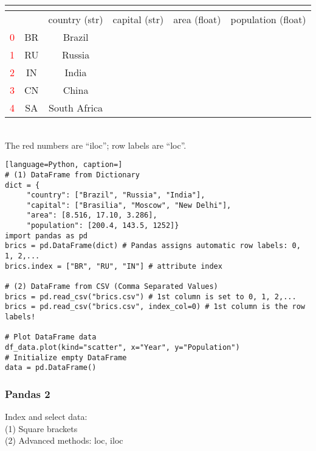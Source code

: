 \documentclass[12pt]{article}
\newcommand{\q}[1]{``#1''}
\begin{document}
\begin{table}[!ht]
\centering
\begin{tabular}{c | c | c | c | c | c }
\multicolumn{5}{l}{} \\ [-10pt]
\hline\hline
& & country (str) & capital (str) & area (float) & population (float)  \\
\hline
\textcolor{red}{0} & BR & Brazil & & &  \\
\textcolor{red}{1} & RU & Russia & & &  \\
\textcolor{red}{2} & IN & India & & &  \\
\textcolor{red}{3} & CN & China & & &  \\
\textcolor{red}{4} & SA & South Africa & & &  \\
\hline
\end{tabular}

\noindent
\textcolor{white}{.} \\
The red numbers are \q{iloc}; row labels are \q{loc}.
\end{table}

\begin{lstlisting}[language=Python, caption=]
# (1) DataFrame from Dictionary
dict = {
     "country": ["Brazil", "Russia", "India"], 
     "capital": ["Brasilia", "Moscow", "New Delhi"], 
     "area": [8.516, 17.10, 3.286], 
     "population": [200.4, 143.5, 1252]}
import pandas as pd
brics = pd.DataFrame(dict) # Pandas assigns automatic row labels: 0, 1, 2,...
brics.index = ["BR", "RU", "IN"] # attribute index

# (2) DataFrame from CSV (Comma Separated Values)
brics = pd.read_csv("brics.csv") # 1st column is set to 0, 1, 2,...
brics = pd.read_csv("brics.csv", index_col=0) # 1st column is the row labels!

# Plot DataFrame data
df_data.plot(kind="scatter", x="Year", y="Population")
# Initialize empty DataFrame
data = pd.DataFrame()
\end{lstlisting}

\subsubsection{\normalsize Pandas 2}
Index and select data:\\
(1) Square brackets \\
(2) Advanced methods: loc, iloc
\end{document}
